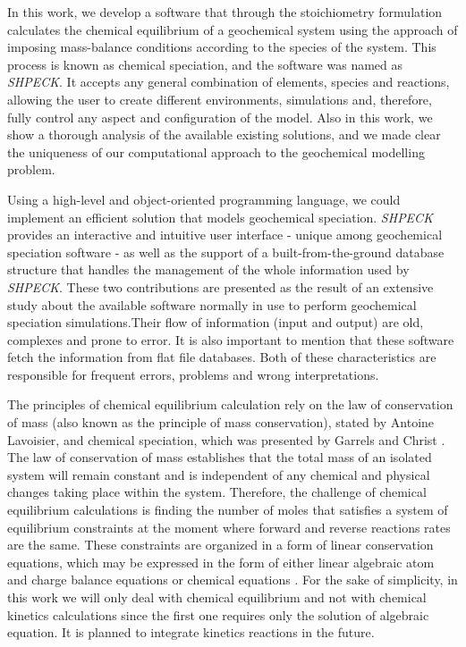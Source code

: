 \documentclass[ppgc,mestrado,english]{iiufrgs}
\begin{document}

In this work, we develop a software that through the stoichiometry formulation calculates the chemical equilibrium of a geochemical system using the approach of imposing mass-balance conditions according to the species of the system. This process is known as chemical speciation, and the software was named as \emph{SHPECK}. It accepts any general combination of elements, species and reactions, allowing the user to create different environments, simulations and, therefore, fully control any aspect and configuration of the model. Also in this work, we show a thorough analysis of the available existing solutions, and we made clear the uniqueness of our computational approach to the geochemical modelling problem. 

Using a high-level and object-oriented programming language, we could implement an efficient solution that models geochemical speciation. \emph{SHPECK} provides an interactive and intuitive user interface - unique among geochemical speciation software - as well as the support of a built-from-the-ground database structure that handles the management of the whole information used by \emph{SHPECK}. These two contributions are presented as the result of an extensive study about the available software normally in use to perform geochemical speciation simulations.Their flow of information (input and output) are old, complexes and prone to error. It is also important to mention that these software fetch the information from flat file databases. Both of these characteristics are responsible for frequent errors, problems and wrong interpretations.


The principles of chemical equilibrium calculation rely on the law of conservation of mass (also known as the principle of mass conservation), stated by Antoine Lavoisier, and chemical speciation, which was presented by Garrels and Christ \cite{Garrels:65}. The law of conservation of mass establishes that the total mass of an isolated system will remain constant and is independent of any chemical and physical changes taking place within the system. Therefore, the challenge of chemical equilibrium calculations is finding the number of moles that satisfies a system of equilibrium constraints at the moment where forward and reverse reactions rates are the same. These constraints are organized in a form of linear conservation equations, which may be expressed in the form of either linear algebraic atom and charge balance equations or chemical equations \cite{SmithMissen83}. For the sake of simplicity, in this work we will only deal with chemical equilibrium and not with chemical kinetics calculations since the first one requires only the solution of algebraic equation. It is planned to integrate kinetics reactions in the future.
\end{document}
